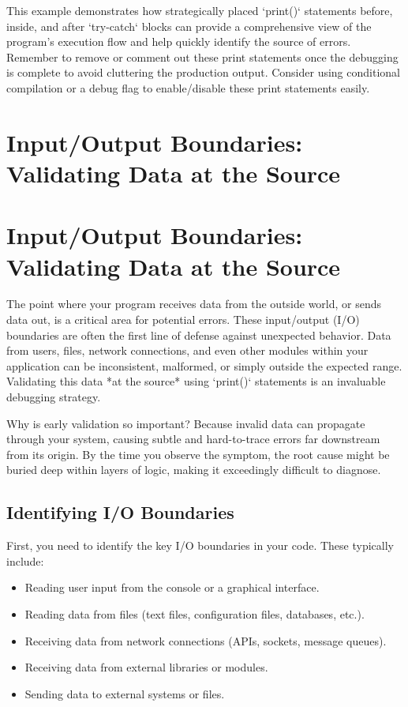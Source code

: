 \documentclass{article}
\begin{document}
{{{This example demonstrates how strategically placed `print()` statements before, inside, and after `try-catch` blocks can provide a comprehensive view of the program's execution flow and help quickly identify the source of errors. Remember to remove or comment out these print statements once the debugging is complete to avoid cluttering the production output. Consider using conditional compilation or a debug flag to enable/disable these print statements easily.

\newpage

\section*{Input/Output Boundaries: Validating Data at the Source} %
\label{chapter-3-6-Input_Output_Boundaries__Validating_Data}

\section*{Input/Output Boundaries: Validating Data at the Source}

The point where your program receives data from the outside world, or sends data out, is a critical area for potential errors. These input/output (I/O) boundaries are often the first line of defense against unexpected behavior. Data from users, files, network connections, and even other modules within your application can be inconsistent, malformed, or simply outside the expected range. Validating this data *at the source* using `print()` statements is an invaluable debugging strategy.

Why is early validation so important? Because invalid data can propagate through your system, causing subtle and hard-to-trace errors far downstream from its origin. By the time you observe the symptom, the root cause might be buried deep within layers of logic, making it exceedingly difficult to diagnose.

\subsection*{Identifying I/O Boundaries}

First, you need to identify the key I/O boundaries in your code. These typically include:

\begin{itemize}
    \itemsep0em
    \item Reading user input from the console or a graphical interface.
    \item Reading data from files (text files, configuration files, databases, etc.).
    \item Receiving data from network connections (APIs, sockets, message queues).
    \item Receiving data from external libraries or modules.
    \item Sending data to external systems or files.
\end{itemize}

}}}
\end{document}
